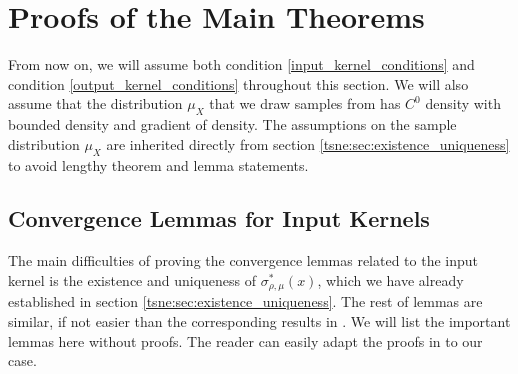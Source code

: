 \documentclass[10pt]{article}
\newenvironment{Proof of lemma}{\noindent{\bf Proof of Lemma}}{\hfill$\Box$\newline}
\newenvironment{Proof of claim}{\noindent{\bf Proof of claim}}{\hfill$\Box$\newline}
\newenvironment{Proof of theorem}{\noindent{\bf Proof of Theorem}}{\hfill\scriptsize{$\Box$}\newline}
\newenvironment{Proof of theorems}{\noindent{\bf Proof of Theorems}}{\hfill$\Box$\newline}
\newenvironment{Proof of proposition}{\noindent{\bf Proof of Proposition}}{\hfill$\Box$\newline}
\newenvironment{Proof of propositions}{\noindent{\bf Proof of Propositions}}{\hfill$\Box$\newline}
\newenvironment{Proof of exercise}{\noindent{\it Proof of Exercise:}}{\hfill$\Box$}
\numberwithin{equation}{section}
\begin{document}
\section{Proofs of the Main Theorems} \label{tsne:sec:proofs}
From now on, we will assume both condition \ref{input_kernel_conditions} and
condition \ref{output_kernel_conditions} throughout this section. We will also
assume that the distribution $\mu_X$ that we draw samples from has $C^0$
density with bounded density and gradient of density. The assumptions on the
sample distribution $\mu_X$ are inherited directly from section
\ref{tsne:sec:existence_uniqueness} to avoid lengthy theorem and lemma
statements.
\subsection{Convergence Lemmas for Input Kernels} \label{tsne:sec:input_kernel_convergence}
The main difficulties of proving the convergence lemmas related to the input
kernel is the existence and uniqueness of $\sigma^*_{\rho,\mu}(x)$, which we
have already established in section \ref{tsne:sec:existence_uniqueness}. The
rest of lemmas are similar, if not easier than the corresponding results in
\cite{auffinger-tsne}. We will list the important lemmas here without proofs.
The reader can easily adapt the proofs in \cite{auffinger-tsne} to our case.
\end{document}
